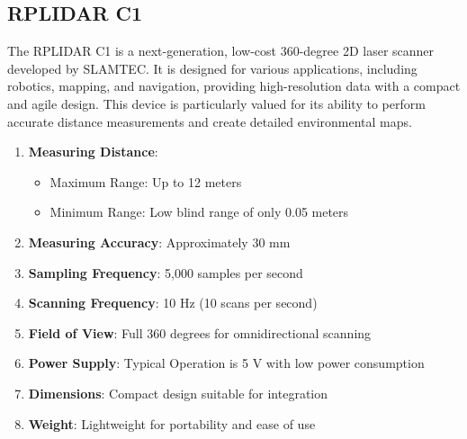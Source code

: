 \subsection{\fontsize{14}{16} RPLIDAR C1}
{
	\fontsize{12}{14}
	The RPLIDAR C1 is a next-generation, low-cost 360-degree 2D laser scanner developed by SLAMTEC. It is designed for various applications, including robotics, mapping, and navigation, providing high-resolution data with a compact and agile design. This device is particularly valued for its ability to perform accurate distance measurements and create detailed environmental maps.
	\begin{enumerate}
		\item \textbf{Measuring Distance}:
		\begin{itemize}
			\item Maximum Range: Up to 12 meters
			\item Minimum Range: Low blind range of only 0.05 meters
		\end{itemize}
		
		\item \textbf{Measuring Accuracy}: Approximately 30 mm
		
		\item \textbf{Sampling Frequency}: 5,000 samples per second

		
		\item \textbf{Scanning Frequency}: 10 Hz (10 scans per second)
		
		\item \textbf{Field of View}: Full 360 degrees for omnidirectional scanning
		
		\item \textbf{Power Supply}: Typical Operation is 5 V with low power consumption
		
		\item \textbf{Dimensions}: Compact design suitable for integration
		
		\item \textbf{Weight}: Lightweight for portability and ease of use
	\end{enumerate}
	
}
